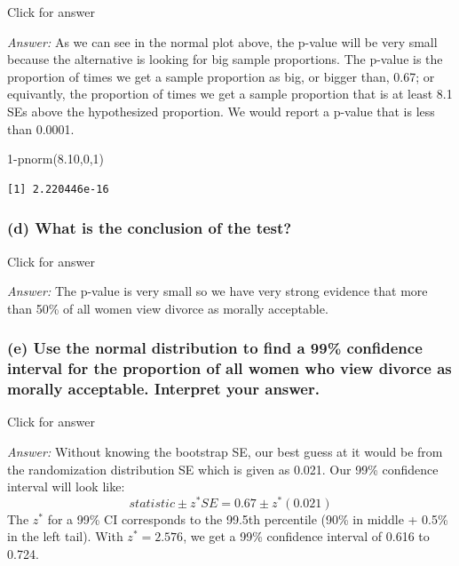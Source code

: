 \documentclass[
]{book}
\newenvironment{Shaded}{\begin{snugshade}}{\end{snugshade}}
\newcommand{\DecValTok}[1]{\textcolor[rgb]{0.00,0.00,0.81}{#1}}
\newcommand{\FloatTok}[1]{\textcolor[rgb]{0.00,0.00,0.81}{#1}}
\newcommand{\FunctionTok}[1]{\textcolor[rgb]{0.00,0.00,0.00}{#1}}
\newcommand{\NormalTok}[1]{#1}
\newcommand{\SpecialCharTok}[1]{\textcolor[rgb]{0.00,0.00,0.00}{#1}}
\begin{document}
Click for answer

\emph{Answer:} As we can see in the normal plot above, the p-value will be very small because the alternative is looking for big sample proportions. The p-value is the proportion of times we get a sample proportion as big, or bigger than, 0.67; or equivantly, the proportion of times we get a sample proportion that is at least 8.1 SEs above the hypothesized proportion. We would report a p-value that is less than 0.0001.

\begin{Shaded}
\begin{Highlighting}[]
\DecValTok{1}\SpecialCharTok{{-}}\FunctionTok{pnorm}\NormalTok{(}\FloatTok{8.10}\NormalTok{,}\DecValTok{0}\NormalTok{,}\DecValTok{1}\NormalTok{)}
\end{Highlighting}
\end{Shaded}

\begin{verbatim}
[1] 2.220446e-16
\end{verbatim}

\hypertarget{d-what-is-the-conclusion-of-the-test}{%
\subsubsection{(d) What is the conclusion of the test?}\label{d-what-is-the-conclusion-of-the-test}}

Click for answer

\emph{Answer:} The p-value is very small so we have very strong evidence that more than 50\% of all women view divorce as morally acceptable.

\hypertarget{e-use-the-normal-distribution-to-find-a-99-confidence-interval-for-the-proportion-of-all-women-who-view-divorce-as-morally-acceptable.-interpret-your-answer.}{%
\subsubsection{(e) Use the normal distribution to find a 99\% confidence interval for the proportion of all women who view divorce as morally acceptable. Interpret your answer.}\label{e-use-the-normal-distribution-to-find-a-99-confidence-interval-for-the-proportion-of-all-women-who-view-divorce-as-morally-acceptable.-interpret-your-answer.}}

Click for answer

\emph{Answer:} Without knowing the bootstrap SE, our best guess at it would be from the randomization distribution SE which is given as 0.021. Our 99\% confidence interval will look like:
\[
statistic \pm z^*SE = 0.67 \pm z^* (0.021) 
\]
The \(z^*\) for a 99\% CI corresponds to the 99.5th percentile (90\% in middle + 0.5\% in the left tail). With \(z^* = 2.576\), we get a 99\% confidence interval of 0.616 to 0.724.
\end{document}
